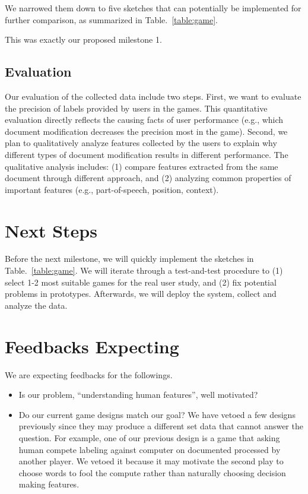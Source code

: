 \documentclass{article}
\begin{document}
We narrowed them down to five sketches that can potentially be implemented for further comparison, as summarized in Table.~\ref{table:game}.

This was exactly our proposed milestone 1.

\subsection{Evaluation} Our evaluation of the collected data include two steps. First, we want to evaluate the precision of labels provided by users in the games. This quantitative evaluation directly reflects the causing facts of user performance (e.g., which document modification decreases the precision most in the game). Second, we plan to qualitatively analyze features collected by the users to explain why different types of document modification results in different performance. The qualitative analysis includes: (1) compare features extracted from the same document through different approach, and (2) analyzing common properties of important features (e.g., part-of-speech, position, context).

\section{Next Steps}

Before the next milestone, we will quickly implement the sketches in Table.~\ref{table:game}. 
We will iterate through a test-and-test procedure to (1) select 1-2 most suitable games for the real user study, and (2) fix potential problems in prototypes. 
Afterwards, we will deploy the system, collect and analyze the data.

\section{Feedbacks Expecting}

We are expecting feedbacks for the followings.
\begin{itemize}
\item Is our problem, ``understanding human features'', well motivated? 
\item Do our current game designs match our goal? We have vetoed a few designs previously since they may produce a different set data that cannot answer the question. For example, one of our previous design is a game that asking human compete labeling against computer on documented processed by another player. We vetoed it because it may motivate the second play to choose words to fool the compute rather than naturally choosing decision making features.
\end{itemize}
\end{document}
